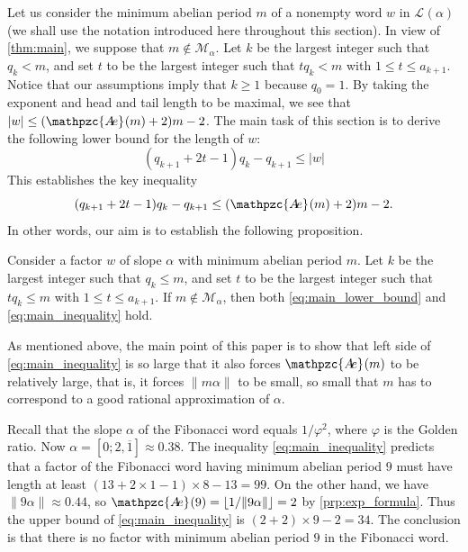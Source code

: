 \documentclass[a4paper,fleqn]{article}
\providecommand{\abs}[1]{\lvert#1\rvert}
\providecommand{\norm}[1]{\lVert#1\rVert}
\providecommand{\floor}[1]{\lfloor#1\rfloor}
\newcommand{\Lang}[2][]{\mathcal{L}_{#1}(#2)}
\newcommand{\abexp}[2][]{\mathpzc{A\mkern-3mu e}_{#1}(#2)}
\begin{document}
  Let us consider the minimum abelian period $m$ of a nonempty word $w$ in $\Lang{\alpha}$ (we shall use the notation
  introduced here throughout this section). In view of \autoref{thm:main}, we suppose that $m \notin
  \mathcal{M}_\alpha$. Let $k$ be the largest integer such that $q_k < m$, and set $t$ to be the largest integer such
  that $tq_k < m$ with $1 \leq t \leq a_{k+1}$. Notice that our assumptions imply that $k \geq 1$ because $q_0 = 1$. By
  taking the exponent and head and tail length to be maximal, we see that $\abs{w} \leq (\abexp{m} + 2)m - 2$. The main
  task of this section is to derive the following lower bound for the length of $w$:
  \begin{equation}\label{eq:main_lower_bound}
    (q_{k+1} + 2t - 1)q_k - q_{k+1} \leq \abs{w}
  \end{equation}
  This establishes the key inequality
  \begin{equation}\label{eq:main_inequality}
    (q_{k+1} + 2t - 1)q_k - q_{k+1} \leq (\abexp{m} + 2)m - 2.
  \end{equation}
  In other words, our aim is to establish the following proposition.
  
  \begin{proposition}\label{prp:main_inequality}
    Consider a factor $w$ of slope $\alpha$ with minimum abelian period $m$. Let $k$ be the largest integer such that
    $q_k \leq m$, and set $t$ to be the largest integer such that $tq_k \leq m$ with $1 \leq t \leq a_{k+1}$. If
    $m \notin \mathcal{M}_\alpha$, then both \eqref{eq:main_lower_bound} and \eqref{eq:main_inequality} hold.
  \end{proposition}

  As mentioned above, the main point of this paper is to show that left side of \eqref{eq:main_inequality} is so large
  that it also forces $\abexp{m}$ to be relatively large, that is, it forces $\norm{m\alpha}$ to be small, so small
  that $m$ has to correspond to a good rational approximation of $\alpha$.

  \begin{example}
    Recall that the slope $\alpha$ of the Fibonacci word equals $1/\varphi^2$, where $\varphi$ is the Golden ratio.
    Now $\alpha = [0; 2, \overline{1}] \approx 0.38$. The inequality \eqref{eq:main_inequality} predicts that a factor
    of the Fibonacci word having minimum abelian period $9$ must have length at least
    $(13 + 2 \times 1 - 1) \times 8 - 13 = 99$. On the other hand, we have $\norm{9\alpha} \approx 0.44$, so
    $\abexp{9} = \floor{1/\norm{9\alpha}} = 2$ by \autoref{prp:exp_formula}. Thus the upper bound of
    \eqref{eq:main_inequality} is $(2 + 2) \times 9 - 2 = 34$. The conclusion is that there is no factor with minimum
    abelian period $9$ in the Fibonacci word.
  \end{example}
  
\end{document}
